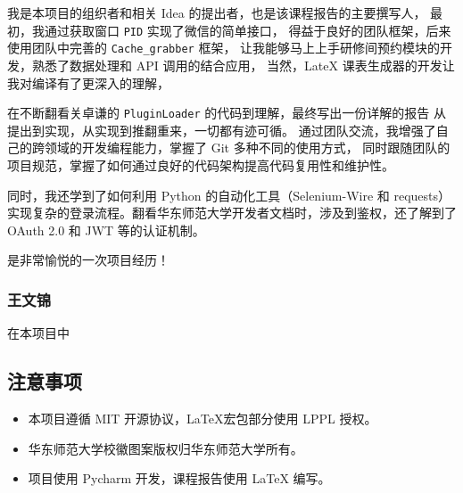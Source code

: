 \documentclass[14pt,a4paper,UTF8,twoside]{article}
\begin{document}
    \begin{Thought}
        我是本项目的组织者和相关 Idea 的提出者，也是该课程报告的主要撰写人，
        最初，我通过获取窗口 \texttt{PID} 实现了微信的简单接口，
        得益于良好的团队框架，后来使用团队中完善的 \texttt{Cache\_grabber} 框架，
        让我能够马上上手研修间预约模块的开发，熟悉了数据处理和 API 调用的结合应用，
        当然，LateX 课表生成器的开发让我对编译有了更深入的理解，

        \vspace{0.3cm}

        在不断翻看关卓谦的 \texttt{PluginLoader} 的代码到理解，最终写出一份详解的报告
        从提出到实现，从实现到推翻重来，一切都有迹可循。
        通过团队交流，我增强了自己的跨领域的开发编程能力，掌握了 Git 多种不同的使用方式，
        同时跟随团队的项目规范，掌握了如何通过良好的代码架构提高代码复用性和维护性。

        \vspace{0.3cm}

        同时，我还学到了如何利用 Python 的自动化工具（Selenium-Wire 和 requests）
        实现复杂的登录流程。翻看华东师范大学开发者文档时，涉及到鉴权，还了解到了 OAuth 2.0 和 JWT 等的认证机制。

        \vspace{0.3cm}

        是非常愉悦的一次项目经历！
    \end{Thought}

    \subsubsection*{王文锦}

    \begin{Thought}
        在本项目中
    \end{Thought}

    \subsection{注意事项}

    \begin{itemize}
        \item 本项目遵循 MIT 开源协议，\LaTeX 宏包部分使用 LPPL 授权。
        \item 华东师范大学校徽图案版权归华东师范大学所有。
        \item 项目使用 Pycharm 开发，课程报告使用 LaTeX 编写。
    \end{itemize}
\end{document}
